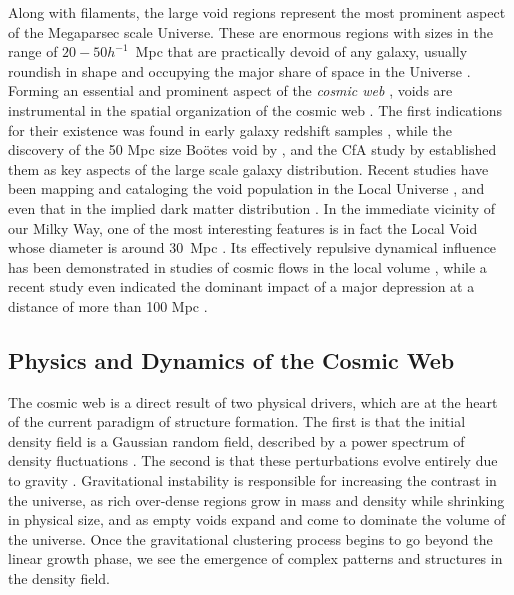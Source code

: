 Along with filaments, the large void regions represent the most prominent aspect of the Megaparsec scale Universe. These are enormous regions 
with sizes in the range of $20-50h^{-1}$~Mpc that are practically devoid of any galaxy, usually roundish in shape and occupying the major 
share of space in the Universe \citep[see][for a recent review]{Iau308}.  Forming an essential and prominent aspect of the 
{\it cosmic web} \citep{Bond1996}, voids are instrumental in the spatial organization of the cosmic web \citep{Icke1984,Sahni1994,
Sheth2003b,Aragon-Calvo2012}. The first indications for their existence was found in early galaxy redshift samples 
\citep{Gregory1978,Zeldovich1982}, while the discovery of the 50 Mpc size Bo\"otes void by \cite{Kirshner1981}, \cite{Kirshner1987} 
and the CfA study by \cite{Lapparent1986} established them as key aspects of the large scale galaxy distribution. Recent studies have 
been mapping and cataloging the void population in the Local Universe \citep{Pan2012,Sutter2012}, and even that in the implied dark 
matter distribution \citep{Leclercq2015b}. In the immediate vicinity of our Milky Way, one of the most interesting features 
is in fact the Local Void whose diameter is around 30~Mpc \citep{Tully1987}. Its effectively repulsive dynamical influence 
has been demonstrated in studies of cosmic flows in the local volume \citep{Tully2008}, while a recent study even indicated the 
dominant impact of a major depression at a distance of more than 100 Mpc \citep[the so-called ``dipole repeller'',][]{Hoffman2017}. 

\subsection{Physics and Dynamics of the Cosmic Web}
The cosmic web is a direct result of two physical drivers, which are at the heart of the current paradigm of structure formation. 
The first is that the initial density field is a Gaussian random field, described by a power spectrum of density fluctuations \citep{Adler1981,bbks}. The second is that these perturbations evolve entirely due to gravity \citep{Peebles1980}. Gravitational instability is responsible 
for increasing the contrast in the universe, as rich over-dense regions grow in mass and density while shrinking in physical size, and as empty 
voids expand and come to dominate the volume of the universe. Once the gravitational clustering process begins to go beyond the 
linear growth phase, we see the emergence of complex patterns and structures in the density field. 


